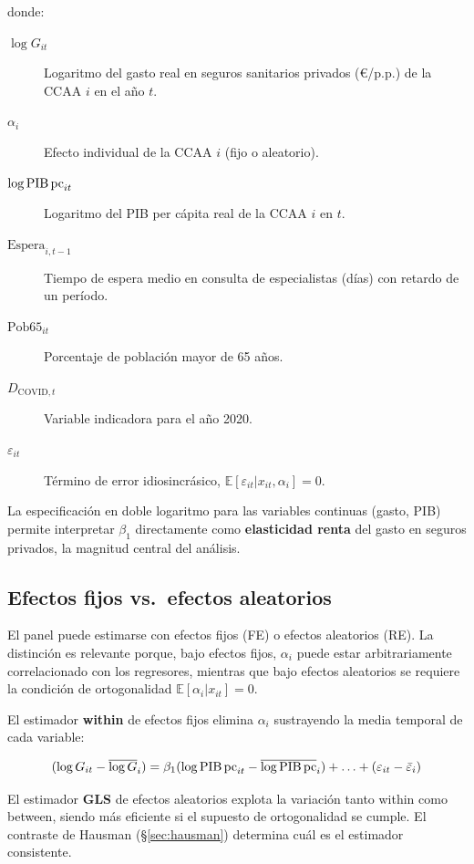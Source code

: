 donde:
\begin{description}
  \item[$\log G_{it}$] Logaritmo del gasto real en seguros sanitarios privados
    (€/p.p.) de la CCAA $i$ en el año $t$.
  \item[$\alpha_{i}$] Efecto individual de la CCAA $i$ (fijo o aleatorio).
  \item[$\log\text{PIB\,pc}_{it}$] Logaritmo del PIB per cápita real de la
    CCAA $i$ en $t$.
  \item[$\text{Espera}_{i,t-1}$] Tiempo de espera medio en consulta de
    especialistas (días) con retardo de un período.
  \item[$\text{Pob65}_{it}$] Porcentaje de población mayor de 65 años.
  \item[$D_{\text{COVID},t}$] Variable indicadora para el año 2020.
  \item[$\varepsilon_{it}$] Término de error idiosincrásico, $\mathbb{E}[\varepsilon_{it}|x_{it},\alpha_i]=0$.
\end{description}

La especificación en doble logaritmo para las variables continuas (gasto, PIB)
permite interpretar $\beta_1$ directamente como \textbf{elasticidad renta} del
gasto en seguros privados, la magnitud central del análisis.

\subsection{Efectos fijos vs.\ efectos aleatorios}

El panel puede estimarse con efectos fijos (FE) o efectos aleatorios (RE). La
distinción es relevante porque, bajo efectos fijos, $\alpha_i$ puede estar
arbitrariamente correlacionado con los regresores, mientras que bajo efectos
aleatorios se requiere la condición de ortogonalidad $\mathbb{E}[\alpha_i | x_{it}] = 0$.

El estimador \textbf{within} de efectos fijos elimina $\alpha_i$ sustrayendo la
media temporal de cada variable:

\begin{equation}
  (\log G_{it} - \overline{\log G}_i) =
  \beta_1 (\log\text{PIB\,pc}_{it} - \overline{\log\text{PIB\,pc}}_i)
  + \ldots + (\varepsilon_{it} - \bar{\varepsilon}_i)
  \label{eq:within}
\end{equation}

El estimador \textbf{GLS} de efectos aleatorios explota la variación tanto
within como between, siendo más eficiente si el supuesto de ortogonalidad se
cumple. El contraste de Hausman (\S\ref{sec:hausman}) determina cuál es el
estimador consistente.

